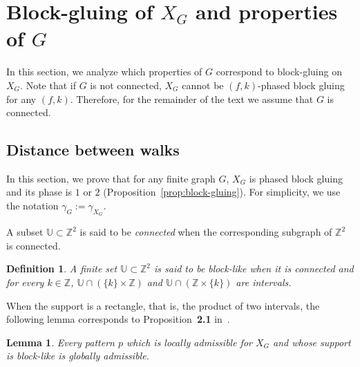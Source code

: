 \documentclass{article}
\newtheorem{lemma}[theorem]{Lemma}
\newtheorem{definition}[theorem]{Definition}
\begin{document}


\section{Block-gluing of $X_G$ and properties of $G$}\label{sec:properties}

In this section, we analyze which properties of $G$ correspond to block-gluing on $X_G$. Note that if $G$ is not connected, $X_G$ cannot be $(f,k)$-phased block gluing for any $(f,k)$. %
Therefore, for the remainder of the text we assume that $G$ is connected.

\subsection{Distance between walks}

In this section, we prove that for any finite graph $G$, $X_G$ is phased block gluing and its phase is $1$ or $2$ (Proposition~\ref{prop:block-gluing}). 
For simplicity, we use the notation $\gamma_G := \gamma_{X_G}$.

A subset $\mathbb{U} \subset \mathbb{Z}^2$ is said to be \textit{connected} when the corresponding subgraph of $\mathbb{Z}^2$ is connected.

\begin{definition}
A finite set $\mathbb{U} \subset \mathbb Z^2$ is said to be \emph{block-like} when it is connected and for every $k \in \mathbb{Z}$, $\mathbb{U} \cap (\{k\}\times \mathbb Z)$ and $\mathbb{U} \cap (\mathbb Z\times \{k\})$ are intervals.
\end{definition}

When the support is a rectangle, that is, the product of two intervals, the following lemma corresponds to Proposition~\textbf{2.1} in~\cite{CM18}.

\begin{lemma}\label{lem:localglobal}
Every pattern $p$ which is locally admissible for $X_G$ and whose support is block-like is globally admissible.
\end{lemma}
\end{document}
